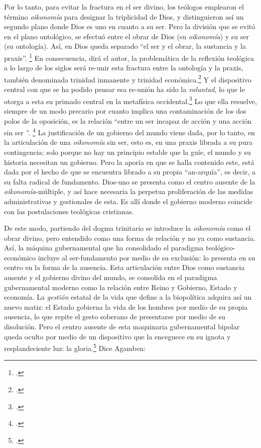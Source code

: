 Por lo tanto, para evitar la fractura en el ser divino, los teólogos emplearon el término \emph{oikonomía} para designar la triplicidad de Dios, y distinguieron así un segundo plano donde Dios es uno en cuanto a su ser. Pero la división que se evitó en el plano ontológico, se efectuó entre el obrar de Dios (su \emph{oikonomía}) y su ser (su ontología). Así, en Dios queda separado \enquote{el ser y el obrar, la sustancia y la praxis}. \footcite[99]{@7102-AGAMBEN2008} En consecuencia, dirá el autor, la problemática de la reflexión teológica a lo largo de los siglos será re-unir esta fractura entre la ontología y la praxis, también denominada trinidad inmanente y trinidad económica.\footcite[268]{@7102-AGAMBEN2008} Y el dispositivo central con que se ha podido pensar esa re-unión ha sido la \emph{voluntad}, lo que le otorga a esta su primado central en la metafísica occidental.\footcite[104]{@7102-AGAMBEN2008} Lo que ella resuelve, siempre de un modo precario por cuanto implica una contaminación de los dos polos de la oposición, es la relación \enquote{entre un ser incapaz de acción y una acción sin ser }. \footcite[108]{@7102-AGAMBEN2008} La justificación de un gobierno del mundo viene dada, por lo tanto, en la articulación de una \emph{oikonomía} sin ser, esto es, en una praxis librada a su pura contingencia: solo porque no hay un principio estable que la guíe, el mundo y su historia necesitan un gobierno. Pero la aporía en que se halla contenido este, está dada por el hecho de que se encuentra librado a su propia \enquote{an-arquía}, es decir, a su falta radical de fundamento. Dios-uno se presenta como el centro ausente de la \emph{oikonomía}-múltiple, y así hace necesaria la perpetua proliferación de las medidas administrativas y gestionales de esta. Es allí donde el gobierno moderno coincide con las postulaciones teológicas cristianas.

De este modo, partiendo del dogma trinitario se introduce la \emph{oikonomía} como el obrar divino, pero entendido como una forma de relación y no ya como sustancia. Así, la máquina gubernamental que ha consolidado el paradigma teológico-económico incluye al ser-fundamento por medio de su exclusión: lo presenta en su centro en la forma de la ausencia. Esta articulación entre Dios como sustancia ausente y el gobierno divino del mundo, se consolida en el paradigma gubernamental moderno como la relación entre Reino y Gobierno, Estado y economía. La \emph{gestión} estatal de la vida que define a la biopolítica adquira así un nuevo matiz: el Estado gobierna la vida de los hombres por medio de su propia ausencia, lo que repite el gesto soberano de presentarse por medio de su disolución. Pero el centro ausente de esta maquinaria gubernamental bipolar queda oculto por medio de un dispositivo que la enceguece en su ignota y resplandeciente luz: la gloria.\footcite[323]{@7102-AGAMBEN2008} Dice Agamben:

